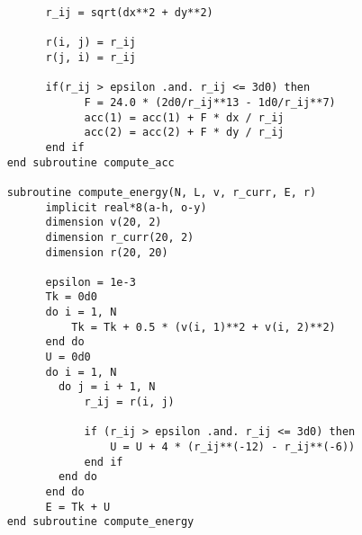 \begin{verbatim}
          r_ij = sqrt(dx**2 + dy**2)
          
          r(i, j) = r_ij 
          r(j, i) = r_ij

          if(r_ij > epsilon .and. r_ij <= 3d0) then 
                F = 24.0 * (2d0/r_ij**13 - 1d0/r_ij**7)
                acc(1) = acc(1) + F * dx / r_ij 
                acc(2) = acc(2) + F * dy / r_ij
          end if 
    end subroutine compute_acc

    subroutine compute_energy(N, L, v, r_curr, E, r)
          implicit real*8(a-h, o-y)
          dimension v(20, 2)
          dimension r_curr(20, 2)
          dimension r(20, 20)
          
          epsilon = 1e-3
          Tk = 0d0
          do i = 1, N
              Tk = Tk + 0.5 * (v(i, 1)**2 + v(i, 2)**2)
          end do
          U = 0d0
          do i = 1, N
            do j = i + 1, N
                r_ij = r(i, j)

                if (r_ij > epsilon .and. r_ij <= 3d0) then
                    U = U + 4 * (r_ij**(-12) - r_ij**(-6))
                end if
            end do
          end do
          E = Tk + U
    end subroutine compute_energy
\end{verbatim}